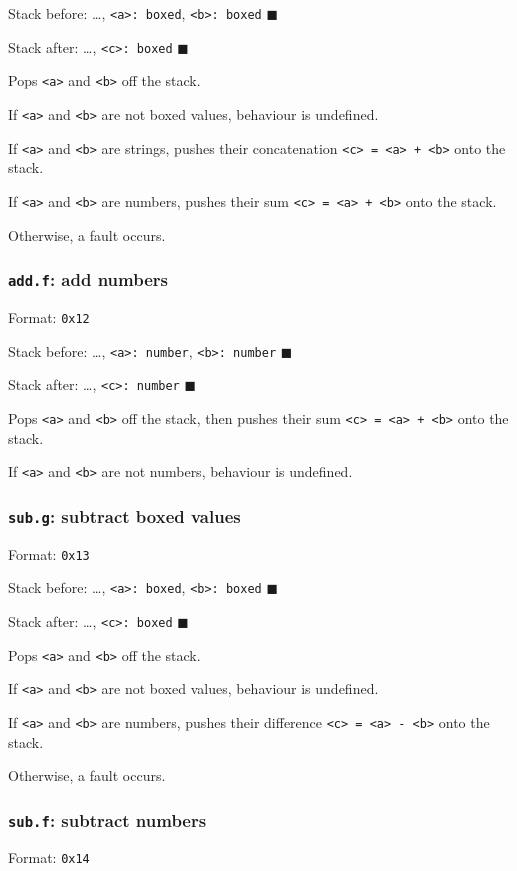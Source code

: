 Stack before: \ldots{}, \texttt{<a>: boxed}, \texttt{<b>: boxed} \(\blacksquare\)

Stack after: \ldots{}, \texttt{<c>: boxed} \(\blacksquare\)

Pops \texttt{<a>} and \texttt{<b>} off the stack.

If \texttt{<a>} and \texttt{<b>} are not boxed values, behaviour is undefined.

If \texttt{<a>} and \texttt{<b>} are strings, pushes their concatenation
\texttt{<c> = <a> + <b>} onto the stack.

If \texttt{<a>} and \texttt{<b>} are numbers, pushes their sum \texttt{<c> = <a> + <b>} onto
the stack.

Otherwise, a fault occurs.

\subsubsection{\texttt{add.f}: add numbers}
\label{sec:org117c408}
Format: \texttt{0x12}

Stack before: \ldots{}, \texttt{<a>: number}, \texttt{<b>: number} \(\blacksquare\)

Stack after: \ldots{}, \texttt{<c>: number} \(\blacksquare\)

Pops \texttt{<a>} and \texttt{<b>} off the stack, then pushes their sum
\texttt{<c> = <a> + <b>} onto the stack.

If \texttt{<a>} and \texttt{<b>} are not numbers, behaviour is undefined.

\subsubsection{\texttt{sub.g}: subtract boxed values}
\label{sec:org379b868}
Format: \texttt{0x13}

Stack before: \ldots{}, \texttt{<a>: boxed}, \texttt{<b>: boxed} \(\blacksquare\)

Stack after: \ldots{}, \texttt{<c>: boxed} \(\blacksquare\)

Pops \texttt{<a>} and \texttt{<b>} off the stack.

If \texttt{<a>} and \texttt{<b>} are not boxed values, behaviour is undefined.

If \texttt{<a>} and \texttt{<b>} are numbers, pushes their difference
\texttt{<c> = <a> - <b>} onto the stack.

Otherwise, a fault occurs.

\subsubsection{\texttt{sub.f}: subtract numbers}
\label{sec:org371fd15}
Format: \texttt{0x14}

